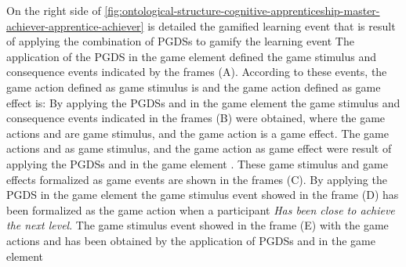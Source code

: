 On the right side of \autoref{fig:ontological-structure-cognitive-apprenticeship-master-achiever-apprentice-achiever} is detailed the gamified learning event  that is result of applying the combination of PGDSs  to gamify the learning event 
The application of the PGDS  in the game element  defined the game stimulus and consequence events indicated by the frames (A). According to these events, the game action defined as game stimulus is  and the game action defined as game effect is: 
By applying the PGDSs  and  in the game element  the game stimulus and consequence events indicated in the frames (B) were obtained, where the game actions  and  are game stimulus, and the game action  is a game effect.
The game actions  and  as game stimulus, and the game action  as game effect were result of applying the PGDSs  and  in the game element .
These game stimulus and game effects formalized as game events are shown in the frames (C).
By applying the PGDS  in the game element  the game stimulus event showed in the frame (D) has been formalized as the game action  when a participant \emph{Has been close to achieve the next level}.
The game stimulus event showed in the frame (E) with the game actions   and  has been obtained by the application of PGDSs  and  in the game element 
